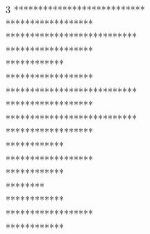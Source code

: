 \begin{enumerate}
	{3}
	{***************************\vspace{-2.2mm}\\
		*\phantom{*}**\phantom{*}**\phantom{*}**\phantom{*}**\phantom{*}**\phantom{*}**\phantom{*}**\phantom{*}**\phantom{*}*\vspace{-2.2mm}\\
		***************************\vspace{-2.2mm}\\
		***\phantom{***}******\phantom{***}******\phantom{***}***\vspace{-2.2mm}\\
		*\phantom{*}*\phantom{***}*\phantom{*}**\phantom{*}*\phantom{***}*\phantom{*}**\phantom{*}*\phantom{***}*\phantom{*}*\vspace{-2.2mm}\\
		***\phantom{***}******\phantom{***}******\phantom{***}***\vspace{-2.2mm}\\
		***************************\vspace{-2.2mm}\\
		*\phantom{*}**\phantom{*}**\phantom{*}**\phantom{*}**\phantom{*}**\phantom{*}**\phantom{*}**\phantom{*}**\phantom{*}*\vspace{-2.2mm}\\
		***************************\vspace{-2.2mm}\\
		*********\phantom{*********}*********\vspace{-2.2mm}\\
		*\phantom{*}**\phantom{*}**\phantom{*}*\phantom{*********}*\phantom{*}**\phantom{*}**\phantom{*}*\vspace{-2.2mm}\\
		*********\phantom{*********}*********\vspace{-2.2mm}\\
		***\phantom{***}***\phantom{*********}***\phantom{***}***\vspace{-2.2mm}\\
		*\phantom{*}*\phantom{***}*\phantom{*}*\phantom{*********}*\phantom{*}*\phantom{***}*\phantom{*}*\vspace{-2.2mm}\\
		***\phantom{***}***\phantom{*********}***\phantom{***}***\vspace{-2.2mm}\\
		*********\phantom{*********}*********\vspace{-2.2mm}\\
		*\phantom{*}**\phantom{*}**\phantom{*}*\phantom{*********}*\phantom{*}**\phantom{*}**\phantom{*}*\vspace{-2.2mm}\\
}
\end{enumerate}
